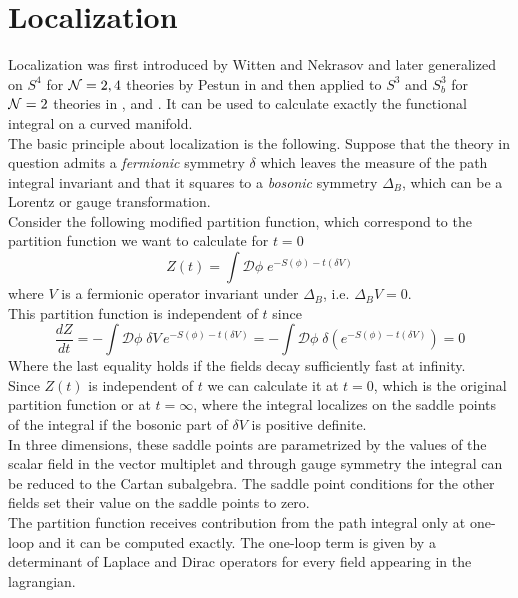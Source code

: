 \section{Localization}
Localization was first introduced by Witten \cite{Witten:1992xu} and Nekrasov \cite{Nekrasov:2002qd} and later generalized on $S^4$ for $\mathcal{N}=2,4$ theories by Pestun in \cite{Pestun:2007rz} and then applied to $S^3$ and $S_b^3$ for $\mathcal{N}=2$ theories in \cite{Kapustin:2009kz}, \cite{Hama:2010av} and \cite{Hama:2011ea}.
It can be used to calculate exactly the functional integral on a curved manifold.\\
The basic principle about localization is the following.
Suppose that the theory in question admits a \emph{fermionic} symmetry $\delta$ which leaves the measure of the path integral invariant and that it squares to a \emph{bosonic} symmetry $\Delta_B$, which can be a Lorentz or gauge transformation.\\
Consider the following modified partition function, which correspond to the partition function we want to calculate for $t=0$
\begin{equation}
Z(t) = \int \mathcal{D} \phi \; e^{- S(\phi) - t (\delta V)}
\end{equation}
where $V$ is a fermionic operator invariant under $\Delta_B$, i.e. $ \Delta_B V = 0$.\\
This partition function is independent of $t$ since
\begin{equation}
 \frac{d Z}{d t} = - \int \mathcal{D} \phi \; \delta V \, e^{- S(\phi) - t (\delta V)} =  - \int  \mathcal{D} \phi \; \delta \left( e^{- S(\phi) - t (\delta V)  }\right) = 0
\end{equation}
Where the last equality holds if the fields decay sufficiently fast at infinity.\\
Since $Z(t)$ is independent of $t$ we can calculate it at $t=0$, which is the original partition function or at $t=\infty$, where the integral localizes on the saddle points of the integral if the bosonic part of $\delta V$ is positive definite.\\
In three dimensions, these saddle points are parametrized by the values of the scalar field in the vector multiplet and through gauge symmetry the integral can be reduced to the Cartan subalgebra. 
The saddle point conditions for the other fields set their value on the saddle points to zero.\\
The partition function receives contribution from the path integral only at one-loop and it can be computed exactly.
The one-loop term is given by a determinant of Laplace and Dirac operators for every field appearing in the lagrangian.
